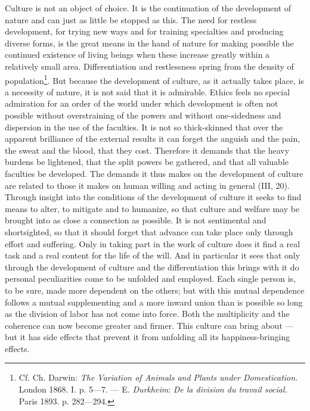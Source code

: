 \documentclass[12pt,a4paper,openany]{book}
\newcommand{\opage}[1]{\marginnote{\footnotesize\textit{[#1]}}}
\begin{document}
Culture is not an object of choice. It is the continuation of the development of nature and can just as
little be stopped as this. The need for restless development, for trying new ways and for training
specialties and producing diverse forms, is the great means in the hand of nature for making possible the
continued existence of living beings when these increase greatly within a relatively small area.
Differentiation and restlessness spring from the density of population\footnote[1]{Cf. Ch. Darwin:
\textit{The Variation of Animals and Plants under Domestication.} London 1868. I. p. 5---7. --- E.
\emph{Durkheim}: \textit{De la division du travail social.} Paris 1893. p. 282---294.}. But because the
development of culture, as it actually takes place, is a necessity of nature, it is not said that it is
admirable. Ethics feels no special admiration for an order of the world under which development is often
not possible without overstraining of the powers and without one-sidedness and dispersion in the use of
the faculties. It is
\opage{148}not so thick-skinned that over the apparent brilliance of the external results it can forget the
anguish and the pain, the sweat and the blood, that they cost. Therefore it demands that the heavy
burdens be lightened, that the split powers be gathered, and that all valuable faculties be developed. The
demands it thus makes on the development of culture are related to those it makes on human willing and
acting in general (III, 20). Through insight into the conditions of the development of culture it seeks to
find means to alter, to mitigate and to humanize, so that culture and welfare may be brought into as close
a connection as possible. It is not sentimental and shortsighted, so that it should forget that advance can
take place only through effort and suffering. Only in taking part in the work of culture does it find a
real task and a real content for the life of the will. And in particular it sees that only through the
development of culture and the differentiation this brings with it do personal peculiarities come to be
unfolded and employed. Each single person is, to be sure, made more dependent on the others; but with this
mutual dependence follows a mutual supplementing and a more inward union than is possible so long as the
division of labor has not come into force. Both the multiplicity and the coherence can now become greater
and firmer. This culture can bring about --- but it has side effects that prevent it from unfolding all its
happiness-bringing effects.
\end{document}
